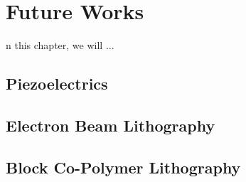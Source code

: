 \chapter{Future Works}
\label{ch:futureworks}

n this chapter, we will ...
\section{Piezoelectrics}
\section{Electron Beam Lithography}
\section{Block Co-Polymer Lithography}